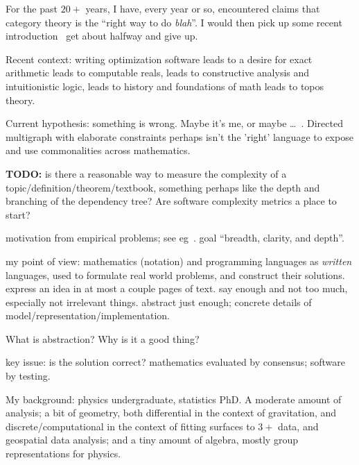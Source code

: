 \documentclass[11pt,openany]{book}
\begin{document}
For the past $20+$ years, I have, every year or so,
encountered claims that
category theory is the ``right way to do \textit{blah}''.
I would then pick up some recent 
introduction~\cite{adamek_herrlich_strecker_1990,
asperti_longo_1991,awodey_2010,
barr_wells_2020,
geroch_1985,hillman_2001_cat_primer,lawvere_schanuel_2009_conceptual_math,
leinster_2016_basic_category_theory,
maclane_1998_cat_for_working_mathematician,nLab_2020,
riehl_2017_cath_in_context,
spivakd_2013_cath_for_scientists,spivakd_2014_cath_for_sciences} 
get about halfway and give up.

Recent context: 
writing optimization software 
leads to a desire for exact arithmetic 
leads to computable reals,
leads to constructive analysis and intuitionistic logic,
leads to history and foundations of math 
leads to topos theory.

Current hypothesis: something is wrong.
Maybe it's me, or maybe \ldots\ . 
Directed multigraph with elaborate constraints 
perhaps isn't the 'right' language to
expose and use commonalities across mathematics.

\textbf{TODO:} is there a reasonable way to measure 
the complexity of a topic/definition/theorem/textbook,
something perhaps like the depth and branching of the
dependency tree? Are software complexity metrics a place to start?

motivation from empirical problems; 
see eg~\cite{maclane1981mathModels}.
goal ``breadth, clarity, and depth''.

my point of view: 
mathematics (notation) and programming languages
as \textit{written} languages,
used to formulate real world problems,
and construct their solutions.
express an idea in at most a couple pages of text.
say enough and not too much, especially not irrelevant things.
abstract just enough; 
concrete details of model/representation/implementation.

What is abstraction? Why is it a good thing? 

key issue: is the solution correct?
mathematics evaluated by consensus;
software by testing.

My background: physics undergraduate, statistics PhD.
A moderate amount of analysis; 
a bit of geometry, both
differential in the context of gravitation, and
discrete/computational in the context of fitting surfaces to
$3+$ data, and geospatial data analysis;
and a tiny amount of algebra, mostly group representations
for physics.
\end{document}
